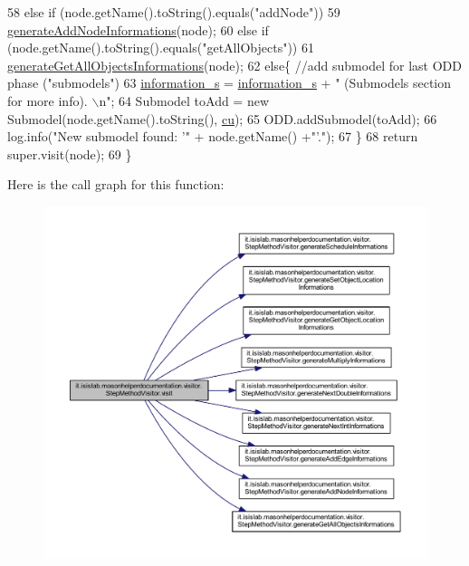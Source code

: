 \begin{DoxyCode}
58         \textcolor{keywordflow}{else} \textcolor{keywordflow}{if} (node.getName().toString().equals(\textcolor{stringliteral}{"addNode"}))
59             \hyperlink{classit_1_1isislab_1_1masonhelperdocumentation_1_1visitor_1_1_step_method_visitor_af1e379d214cb15623eab1e7dcdcf7526}{generateAddNodeInformations}(node);
60         \textcolor{keywordflow}{else} \textcolor{keywordflow}{if} (node.getName().toString().equals(\textcolor{stringliteral}{"getAllObjects"}))
61             \hyperlink{classit_1_1isislab_1_1masonhelperdocumentation_1_1visitor_1_1_step_method_visitor_aaa265bf4266e6eddf5d62a5285239cf9}{generateGetAllObjectsInformations}(node);
62         \textcolor{keywordflow}{else}\{   \textcolor{comment}{//add submodel for last ODD phase ("submodels")}
63             \hyperlink{classit_1_1isislab_1_1masonhelperdocumentation_1_1visitor_1_1_step_method_visitor_adf58f8f5068e330783c3c4bd78080f1a}{information\_s} = \hyperlink{classit_1_1isislab_1_1masonhelperdocumentation_1_1visitor_1_1_step_method_visitor_adf58f8f5068e330783c3c4bd78080f1a}{information\_s} + \textcolor{stringliteral}{" (Submodels section for more info).
      \(\backslash\)n"};
64             Submodel toAdd = \textcolor{keyword}{new} Submodel(node.getName().toString(), \hyperlink{classit_1_1isislab_1_1masonhelperdocumentation_1_1visitor_1_1_step_method_visitor_a2e892060825ccd1ba2382eb96b6d187a}{cu});
65             ODD.addSubmodel(toAdd);
66             log.info(\textcolor{stringliteral}{"New submodel found: '"} + node.getName() +\textcolor{stringliteral}{"'."});           
67         \}
68         \textcolor{keywordflow}{return} super.visit(node);
69     \}
\end{DoxyCode}


Here is the call graph for this function\-:\nopagebreak
\begin{figure}[H]
\begin{center}
\leavevmode
\includegraphics[width=350pt]{classit_1_1isislab_1_1masonhelperdocumentation_1_1visitor_1_1_step_method_visitor_a5ec8cf0c38db7e8a67defaaf8bea6819_cgraph}
\end{center}
\end{figure}


